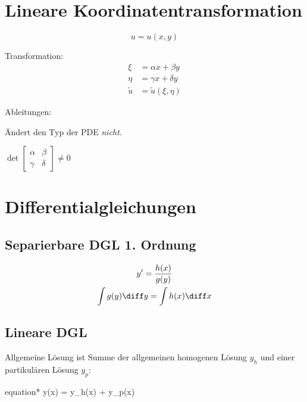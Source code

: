 \section{Lineare Koordinatentransformation} %
	\begin{equation}
		u = u(x,y)
	\end{equation}
	
	Transformation:
	\begin{align*}
		\xi &= \alpha x + \beta y \\
		\eta &= \gamma x + \delta y \\
		\widetilde u &= \widetilde u(\xi,\eta)
	\end{align*}
	
	Ableitungen:
	
	\begin{bemerkungen}
		\item Ändert den Typ der PDE \emph{nicht}.
		\item $\displaystyle \det
			\begin{bmatrix}
				\alpha & \beta \\
				\gamma & \delta
			\end{bmatrix} \neq 0$
	\end{bemerkungen}

\section{Differentialgleichungen} %
	\subsection{Separierbare DGL 1. Ordnung} %
		\begin{gather*}
			y' = \frac{h(x)}{g(y)} \\
			\int g(y) \diff y = \int h(x) \diff x
		\end{gather*}
	\subsection{Lineare DGL} %
		Allgemeine Lösung ist Summe der allgemeinen homogenen Lösung $y_h$
		und einer partikulären Lösung $y_p$:
		\begin{empheq}[box=\shadowbox]{equation*}
			y(x) = y_h(x) + y_p(x)
		\end{empheq}
		
